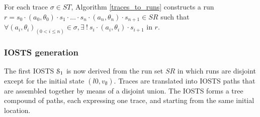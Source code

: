 \begin{proposition}
    For each trace $\sigma \in ST$, Algorithm \ref{traces_to_runs}
    constructs a run $r=s_0 \cdot (a_0,\theta_0) \cdot s_1 \cdot
    \dots \cdot s_n \cdot (a_n,\theta_n) \cdot s_{n+1} \in SR$ such that
    $\forall (a_i,\theta_i)_{(0 < i\leq n)} \in \sigma, \exists ~!~ s_i
    \cdot (a_i,\theta_i) \cdot s_{i+1}$ in $r$.
\end{proposition}


\subsubsection{IOSTS generation}
\label{sec:iosts-gen}

The first IOSTS $\EuScript{S}_1$ is now derived from the run set
$SR$ in which runs are disjoint except for the initial state
$(l0,v_\emptyset)$. Traces are translated into IOSTS paths that
are assembled together by means of a disjoint union. The IOSTS
forms a tree compound of paths, each expressing one trace, and
starting from the same initial location.

